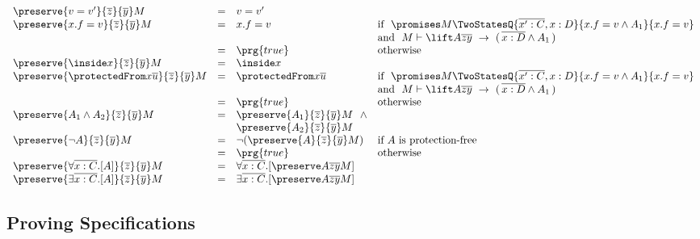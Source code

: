{\small{
$\begin{array}{lcll}
\\
\\
\preserve {v=v'} {\overline z} {\overline y} M  & = &  v=v' 
\\
\preserve {x.f=v} {\overline z} {\overline y} M & = & x.f=v  & \mbox{if} \ \ \promises M   {\TwoStatesQ {\overline {x':C},x:D} {x.f = v \wedge A_1}{x.f=v}} 
\\ 
& & & \mbox{and} \ \ M \vdash {\lift A  {\overline {z}}  {\overline y}} \  \rightarrow \ (\, {\overline {x:D}} \wedge A_1\, )
\\
   & = &   \prg{true} & \mbox{otherwise}
   \\
\preserve  { \inside x}  {\overline z} {\overline y}  M & = &   \inside x 
\\
\preserve  { \protectedFrom x {\overline {u}} }  {\overline z} {\overline y} M  & = &   { \protectedFrom x {\overline {u}} }  & \mbox{if} \ \ \promises M   {\TwoStatesQ {\overline {x':C},x:D} {x.f = v \wedge A_1}{x.f=v}} 
\\ 
& & & \mbox{and} \ \ M \vdash {\lift A  {\overline {z}}  {\overline y}} \  \rightarrow \ (\, {\overline {x:D}} \wedge A_1\, )
\\
   & = &   \prg{true} & \mbox{otherwise}

\\
\preserve  {A_1 \wedge A_2} {\overline z} {\overline y}  M & = & \preserve { A_1}  {\overline z} {\overline y}  M \ \ \wedge \\
& &  \preserve { A_2}  {\overline z} {\overline y}  M
\\
\preserve  {\neg A}{\overline z} {\overline y}  M   & = & \neg (\preserve {A} {\overline z} {\overline y}  M)& \mbox{if  $A$ is protection-free}
\\
  & = &  \prg{true} & \mbox{otherwise}
\\
\preserve {\forall \overline{x:C}.[ A ]} {\overline z} {\overline y}  M   & = & \forall \overline{x:C}.[ \preserve A  {\overline z} {\overline y}  M ] & 
\\
\preserve {\exists \overline{x:C}.[ A ]} {\overline z} {\overline y}  M   & = & \exists \overline{x:C}.[ \preserve A {\overline z} {\overline y}  M  ] & 
\end{array}
$
}}

\subsection{Proving \SpecLang Specifications}

